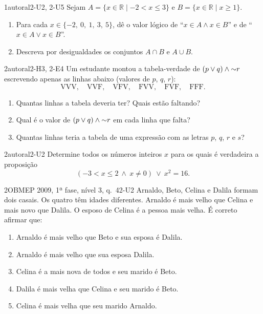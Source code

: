 \begin{questao}{1}{autoral}{2-U2, 2-U5}\label{u2:q4}
Sejam $A=\{x\in\mathbb{R}\mid -2<x\le3\}$ e $B=\{x\in\mathbb{R}\mid x\ge1\}$.
\begin{enumerate}[label=\alph*)]
  \item Para cada $x\in\{-2,\ 0,\ 1,\ 3,\ 5\}$, dê o valor lógico de \enquote{$x\in A\wedge x\in B$} e de \enquote{$x\in A\vee x\in B$}.
  \item Descreva por desigualdades os conjuntos $A\cap B$ e $A\cup B$.
\end{enumerate}
\end{questao}

\begin{questao}{2}{autoral}{2-H3, 2-E4}\label{u2:q5}
Um estudante montou a tabela-verdade de $(p\vee q)\wedge{{\sim}}r$ escrevendo apenas as linhas abaixo (valores de $p$, $q$, $r$):
\[\text{VVV},\quad \text{VVF},\quad \text{VFV},\quad \text{FVV},\quad \text{FVF},\quad \text{FFF}.\]
\begin{enumerate}[label=\alph*)]
  \item Quantas linhas a tabela deveria ter? Quais estão faltando?
  \item Qual é o valor de $(p\vee q)\wedge{{\sim}}r$ em cada linha que falta?
  \item Quantas linhas teria a tabela de uma expressão com as letras $p$, $q$, $r$ e $s$?
\end{enumerate}
\end{questao}

\begin{questao}[integradora]{2}{autoral}{2-U2}\label{u2:q6}
Determine todos os números inteiros $x$ para os quais é verdadeira a proposição
\[(-3<x\le2\ \wedge\ x\neq0)\ \vee\ x^2=16.\]
\end{questao}

\begin{questao}{2}{OBMEP 2009, 1ª fase, nível 3, q.~4}{2-U2}\label{u2:q7}
Arnaldo, Beto, Celina e Dalila formam dois casais. Os quatro têm idades diferentes. Arnaldo é mais velho que Celina e mais novo que Dalila. O esposo de Celina é a pessoa mais velha. É correto afirmar que:
\begin{enumerate}[label=(\alph*)]
  \item Arnaldo é mais velho que Beto e sua esposa é Dalila.
  \item Arnaldo é mais velho que sua esposa Dalila.
  \item Celina é a mais nova de todos e seu marido é Beto.
  \item Dalila é mais velha que Celina e seu marido é Beto.
  \item Celina é mais velha que seu marido Arnaldo.
\end{enumerate}
\end{questao}

